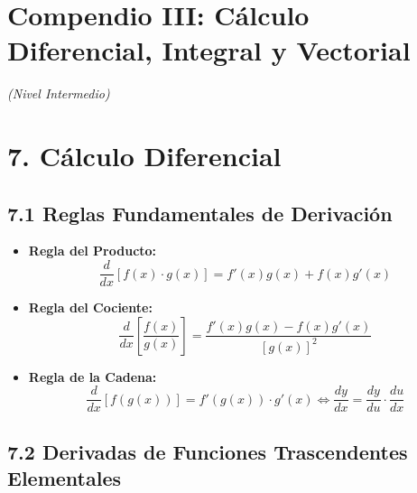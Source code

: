 \documentclass[11pt,a4paper]{article}
\begin{document}
\section*{Compendio III: Cálculo Diferencial, Integral y Vectorial}

\textit{(Nivel Intermedio)}

\section*{7. Cálculo Diferencial}

\subsection*{7.1 Reglas Fundamentales de Derivación}

\begin{itemize}
  \item \textbf{Regla del Producto:}
  \[
    \frac{d}{dx}[f(x) \cdot g(x)] = f'(x)g(x) + f(x)g'(x)
  \]
  \item \textbf{Regla del Cociente:}
  \[
    \frac{d}{dx}\left[\frac{f(x)}{g(x)}\right] = \frac{f'(x)g(x) - f(x)g'(x)}{[g(x)]^2}
  \]
  \item \textbf{Regla de la Cadena:}
  \[
    \frac{d}{dx}[f(g(x))] = f'(g(x)) \cdot g'(x) \iff \frac{dy}{dx} = \frac{dy}{du} \cdot \frac{du}{dx}
  \]
\end{itemize}

\subsection*{7.2 Derivadas de Funciones Trascendentes Elementales}
\end{document}

